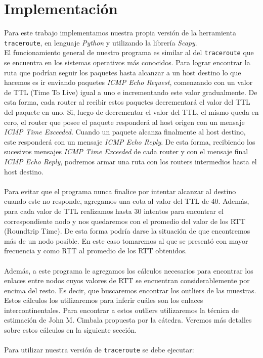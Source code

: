 \section{Implementación}

Para este trabajo implementamos nuestra propia versión de la herramienta \texttt{traceroute}, en lenguaje \emph{Python} y utilizando la librería \emph{Scapy}.
\\
El funcionamiento general de nuestro programa es similar al del \texttt{traceroute} que se encuentra en los sistemas operativos más conocidos. Para lograr encontrar la ruta que podrían seguir los paquetes hasta alcanzar a un host destino lo que hacemos es ir enviando paquetes \emph{ICMP Echo Request}, comenzando con un valor de TTL (Time To Live) igual a uno e incrementando este valor gradualmente. De esta forma, cada router al recibir estos paquetes decrementará el valor del TTL del paquete en uno. Si, luego de decrementar el valor del TTL, el mismo queda en cero, el router que posee el paquete responderá al host origen con un mensaje \emph{ICMP Time Exceeded}. Cuando un paquete alcanza finalmente al host destino, este responderá con un mensaje \emph{ICMP Echo Reply}. De esta forma, recibiendo los sucesivos mensajes \emph{ICMP Time Exceeded} de cada router y con el mensaje final \emph{ICMP Echo Reply}, podremos armar una ruta con los routers intermedios hasta el host destino.
\\\\
Para evitar que el programa nunca finalice por intentar alcanzar al destino cuando este no responde, agregamos una cota al valor del TTL de 40.
Además, para cada valor de TTL realizamos hasta 30 intentos para encontrar el correspondiente nodo y nos quedaremos con el promedio del valor de los RTT (Roundtrip Time). De esta forma podría darse la situación de que encontremos más de un nodo posible. En este caso tomaremos al que se presentó con mayor frecuencia y como RTT al promedio de los RTT obtenidos.
\\\\
Además, a este programa le agregamos los cálculos necesarios para encontrar los enlaces entre nodos cuyos valores de RTT se encuentran considerablemente por encima del resto. Es decir, que buscaremos encontrar los outliers de las muestras. Estos cálculos los utilizaremos para inferir cuáles son los enlaces intercontinentales. Para encontrar a estos outliers utilizaremos la técnica de estimación de John M. Cimbala propuesta por la cátedra. Veremos más detalles sobre estos cálculos en la siguiente sección.
\\\\
Para utilizar nuestra versión de \texttt{traceroute} se debe ejecutar:

